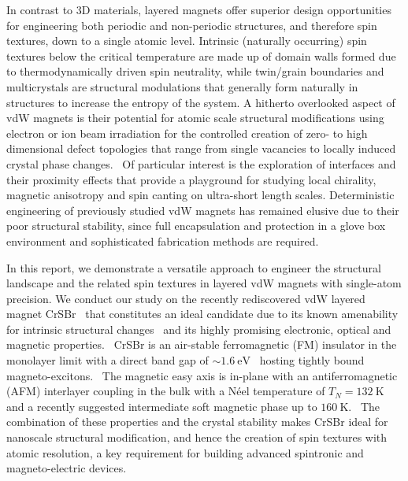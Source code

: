 \documentclass[aps,prl,showpacs,twocolumn,superscriptaddress,floatfix]{revtex4-2}
\begin{document}
In contrast to 3D materials, layered magnets offer superior design opportunities for engineering both periodic and non-periodic structures, and therefore spin textures, down to a single atomic level. Intrinsic (naturally occurring) spin textures below the critical temperature are made up of domain walls formed due to thermodynamically driven spin neutrality, while twin/grain boundaries and multicrystals are structural modulations that generally form naturally in structures to increase the entropy of the system. A hitherto overlooked aspect of vdW magnets is their potential for atomic scale structural modifications using electron or ion beam irradiation for the controlled creation of zero- to high dimensional defect topologies that range from single vacancies to locally induced crystal phase changes.~\cite{Lin.2014} Of particular interest is the exploration of interfaces and their proximity effects that provide a playground for studying local chirality,~\cite{Yu.2010b} magnetic anisotropy and spin canting on ultra-short length scales. Deterministic engineering of previously studied vdW magnets has remained elusive due to their poor structural stability, since full encapsulation and protection in a glove box environment and sophisticated fabrication methods are required.~\cite{deng_gate-tunable_2018,huang_layer-dependent_2017}

In this report, we demonstrate a versatile approach to engineer the structural landscape and the related spin textures in layered vdW magnets with single-atom precision. We conduct our study on the recently rediscovered vdW layered magnet CrSBr~\cite{Katscher.1966,Gser.1990,Wang.2019,Wang.2020} that constitutes an ideal candidate due to its known amenability for intrinsic structural changes~\cite{Gser.1990} and its highly promising electronic, optical and magnetic properties.~\cite{Katscher.1966,Gser.1990,Wang.2019,Wang.2020,Telford.2020,lee_magnetic_2020,Wilson.2021} CrSBr is an air-stable ferromagnetic (FM) insulator in the monolayer limit with a direct band gap of $\sim\SI{1.6}{\electronvolt}$~\cite{Telford.2020,Wang.2020,Wang.2019} hosting tightly bound magneto-excitons.~\cite{Wilson.2021} The magnetic easy axis is in-plane with an antiferromagnetic (AFM) interlayer coupling in the bulk with a N\'{e}el temperature of $T_N = \SI{132}{\kelvin}$~\cite{Gser.1990,lee_magnetic_2020} and a recently suggested intermediate soft magnetic phase up to $\SI{160}{\kelvin}$.~\cite{Telford.2020} The combination of these properties and the crystal stability makes CrSBr ideal for nanoscale structural modification, and hence the creation of spin textures with atomic resolution, a key requirement for building advanced spintronic and magneto-electric devices.
\end{document}

